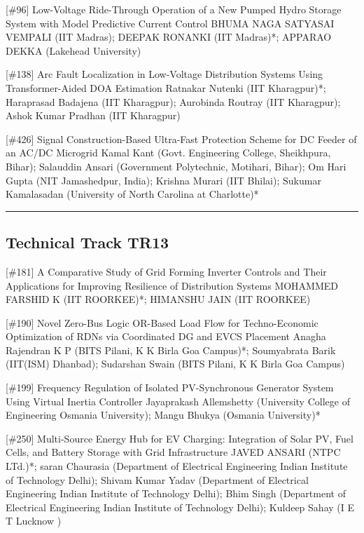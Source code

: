 {} \begin{abstract_online} {[\#96] Low-Voltage Ride-Through Operation of a New Pumped Hydro Storage System with Model Predictive Current Control} {} {BHUMA NAGA SATYASAI VEMPALI (IIT Madras); DEEPAK RONANKI (IIT Madras)*; APPARAO DEKKA (Lakehead University)} {}  \end{abstract_online} 
{} \begin{abstract_online} {[\#138] Arc Fault Localization in Low-Voltage Distribution Systems Using Transformer-Aided DOA Estimation} {} {Ratnakar Nutenki (IIT Kharagpur)*; Haraprasad  Badajena (IIT Kharagpur); Aurobinda Routray (IIT Kharagpur); Ashok Kumar Pradhan (IIT Kharagpur)} {}  \end{abstract_online} 
{} \begin{abstract_online} {[\#426] Signal Construction-Based Ultra-Fast Protection Scheme for DC Feeder of an AC/DC Microgrid} {} {Kamal  Kant (Govt. Engineering College, Sheikhpura, Bihar); Salauddin  Ansari (Government Polytechnic, Motihari, Bihar); Om Hari Gupta (NIT Jamashedpur, India); Krishna  Murari (IIT Bhilai); Sukumar Kamalasadan (University of North Carolina at Charlotte)*} {}  \end{abstract_online} 
\hrule  \subsection{Technical Track TR13}\nopagebreak {} \begin{abstract_online} {[\#181] A Comparative Study of Grid Forming Inverter Controls and Their Applications for Improving Resilience of Distribution Systems} {} {MOHAMMED FARSHID K (IIT ROORKEE)*; HIMANSHU JAIN (IIT ROORKEE)} {}  \end{abstract_online} 
{} \begin{abstract_online} {[\#190] Novel Zero-Bus Logic OR-Based Load Flow for Techno-Economic Optimization of RDNs via Coordinated DG and EVCS Placement} {} {Anagha Rajendran K P (BITS Pilani, K K Birla Goa Campus)*; Soumyabrata Barik (IIT(ISM) Dhanbad); Sudarshan  Swain (BITS Pilani, K K Birla Goa Campus)} {}  \end{abstract_online} 
{} \begin{abstract_online} {[\#199] Frequency Regulation of Isolated PV-Synchronous Generator System Using Virtual Inertia Controller } {} {Jayaprakash Allemshetty (University College of Engineering Osmania University); Mangu Bhukya (Osmania University)*} {}  \end{abstract_online} 
{} \begin{abstract_online} {[\#250] Multi-Source Energy Hub for EV Charging: Integration of Solar PV, Fuel Cells, and Battery Storage with Grid Infrastructure} {} {JAVED ANSARI (NTPC LTd.)*; saran Chaurasia (Department of Electrical Engineering Indian Institute of Technology Delhi); Shivam Kumar  Yadav (Department of Electrical Engineering Indian Institute of Technology Delhi); Bhim Singh (Department of Electrical Engineering Indian Institute of Technology Delhi); Kuldeep  Sahay (I E T Lucknow )} {}  \end{abstract_online} 

